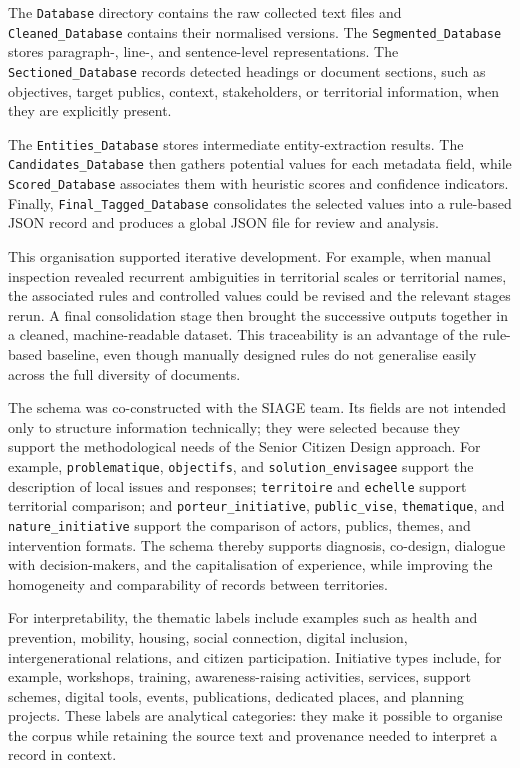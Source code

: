 The \texttt{Database} directory contains the raw collected text files and
\texttt{Cleaned\_Database} contains their normalised versions. The
\texttt{Segmented\_Database} stores paragraph-, line-, and sentence-level
representations. The \texttt{Sectioned\_Database} records detected headings or
document sections, such as objectives, target publics, context, stakeholders, or
territorial information, when they are explicitly present.

The \texttt{Entities\_Database} stores intermediate entity-extraction results.
The \texttt{Candidates\_Database} then gathers potential values for each metadata
field, while \texttt{Scored\_Database} associates them with heuristic scores and
confidence indicators. Finally, \texttt{Final\_Tagged\_Database} consolidates the
selected values into a rule-based JSON record and produces a global JSON file for
review and analysis.

This organisation supported iterative development. For example, when manual
inspection revealed recurrent ambiguities in territorial scales or territorial names,
the associated rules and controlled values could be revised and the relevant stages
rerun. A final consolidation stage then brought the successive outputs together in a
cleaned, machine-readable dataset. This traceability is an advantage of the
rule-based baseline, even though manually designed rules do not generalise easily
across the full diversity of documents.

The schema was co-constructed with the SIAGE team. Its fields are not intended
only to structure information technically; they were selected because they support
the methodological needs of the Senior Citizen Design approach. For example,
\texttt{problematique}, \texttt{objectifs}, and \texttt{solution\_envisagee}
support the description of local issues and responses; \texttt{territoire} and
\texttt{echelle} support territorial comparison; and \texttt{porteur\_initiative},
\texttt{public\_vise}, \texttt{thematique}, and \texttt{nature\_initiative}
support the comparison of actors, publics, themes, and intervention formats. The
schema thereby supports diagnosis, co-design, dialogue with decision-makers, and
the capitalisation of experience, while improving the homogeneity and comparability
of records between territories.

For interpretability, the thematic labels include examples such as health and
prevention, mobility, housing, social connection, digital inclusion,
intergenerational relations, and citizen participation. Initiative types include, for
example, workshops, training, awareness-raising activities, services, support
schemes, digital tools, events, publications, dedicated places, and planning
projects. These labels are analytical categories: they make it possible to organise
the corpus while retaining the source text and provenance needed to interpret a
record in context.

